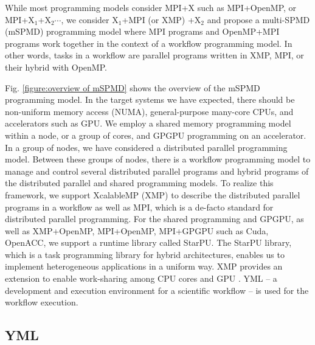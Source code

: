\documentclass[graybox]{svmult}
\begin{document}
While most programming models consider MPI+X such as MPI+OpenMP,  or MPI+X$_{1}$+X$_{2}\cdots $, we consider X$_{1}$+MPI (or XMP) +X$_{2}$ and propose a multi-SPMD (mSPMD) programming model where MPI programs and OpenMP+MPI programs work together in the context of a workflow programming model. In other words, tasks in a workflow are parallel programs written in XMP, MPI, or their hybrid with OpenMP. 

Fig. \ref{figure:overview of mSPMD} shows the overview of the mSPMD programming model. 
In the target systems we have expected, there should be non-uniform memory access (NUMA), general-purpose many-core CPUs, and accelerators such as GPU. 
We employ a shared memory programming model within a node, or a group of cores, and GPGPU programming on an accelerator. In a group of nodes, we have considered a distributed parallel programming model. Between these groups of nodes, there is a workflow programming model to manage and control several distributed parallel programs and hybrid programs of the distributed parallel and shared programming models.
To realize this framework, we support XcalableMP (XMP) to describe the distributed parallel programs in a workflow as well as MPI, which is a de-facto standard for distributed parallel programming.
For the shared programming and GPGPU, as well as XMP+OpenMP, MPI+OpenMP, MPI+GPGPU such as Cuda, OpenACC, we support a runtime library called StarPU. The StarPU library\cite{Augonnet2011starpu}, which is a task programming library for hybrid architectures, enables us to implement heterogeneous applications in a uniform way. 
XMP provides an extension to enable work-sharing among CPU cores and GPU \cite{odajima2013Adaptive}.
YML\cite{delannoy2004a, delannoy2006a, delannoy2006b} -- a development and execution environment for a scientific workflow -- is used for the workflow execution. 

\subsection{YML}
\end{document}
